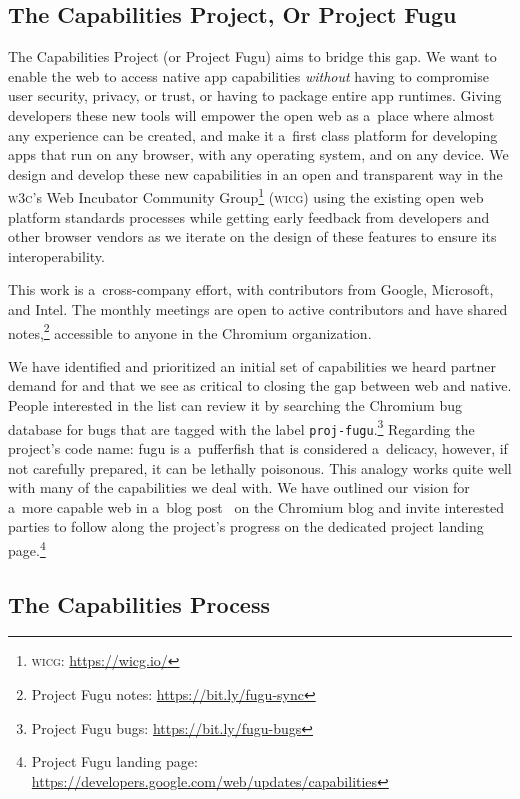 \documentclass[sigconf]{acmart}
\begin{document}
\subsection{The Capabilities Project, Or Project Fugu}

The Capabilities Project (or Project Fugu) aims to bridge this gap.
We want to enable the web to access native app capabilities
\textit{without} having to compromise user security, privacy, or trust,
or having to package entire app runtimes.
Giving developers these new tools will empower the open web
as a~place where almost any experience can be created,
and make it a~first class platform for developing apps that run on any browser,
with any operating system, and on any device.
We design and develop these new capabilities in an open and transparent way
in the \textsc{w3c}'s Web Incubator Community
Group\footnote{\textsc{wicg}: \url{https://wicg.io/}} (\textsc{wicg})
using the existing open web platform standards processes
while getting early feedback from developers and other browser vendors
as we iterate on the design of these features to ensure its interoperability.

This work is a~cross-company effort, with contributors from Google, Microsoft, and Intel.
The monthly meetings are open to active contributors
and have shared notes,\footnote{Project Fugu notes:
\url{https://bit.ly/fugu-sync}}
accessible to anyone in the Chromium organization.

We have identified and prioritized an initial set of capabilities
we heard partner demand for and that we see as critical to closing the gap
between web and native.
People interested in the list can review it by searching the Chromium bug database
for bugs that are tagged with the label
\texttt{proj-fugu}.\footnote{Project Fugu bugs: \url{https://bit.ly/fugu-bugs}}
Regarding the project's code name: fugu is a~pufferfish that is considered a~delicacy, however,  
if not carefully prepared, it can be lethally poisonous. 
This analogy works quite well with many of the capabilities we deal with.
We have outlined our vision for a~more capable web in a~blog post~\cite{lepage18}
on the Chromium blog and invite interested parties to follow along the project's progress
on the dedicated project landing
page.\footnote{Project Fugu landing page:
\url{https://developers.google.com/web/updates/capabilities}}

\subsection{The Capabilities Process}
\end{document}

